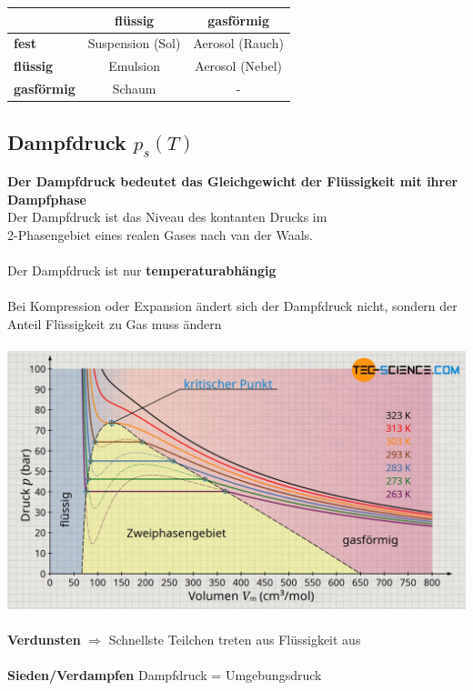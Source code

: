 \begin{center}
	\begin{tabular}{l|cc}
		                   & \textbf{flüssig} & \textbf{gasförmig} \\ \hline
		\textbf{fest}      & Suspension (Sol) & Aerosol (Rauch) \\
		\textbf{flüssig}   & Emulsion & Aerosol (Nebel) \\
		\textbf{gasförmig} & Schaum & - \\
	\end{tabular}
\end{center}






\subsection{Dampfdruck $p_s(T)$}
\textbf{Der Dampfdruck bedeutet das Gleichgewicht der Flüssigkeit mit ihrer Dampfphase} \\

Der Dampfdruck ist das Niveau des kontanten Drucks im\\
2-Phasengebiet eines realen Gases nach van der Waals. \\
\\
Der Dampfdruck ist nur \textbf{temperaturabhängig} \\
\\
Bei Kompression oder Expansion ändert sich der Dampfdruck nicht, sondern der Anteil Flüssigkeit zu Gas muss ändern \\
\\

\includegraphics[width=0.9\linewidth]{Bilder/dampfdruck} \\
\\
\textbf{Verdunsten} $\Rightarrow$ Schnellste Teilchen treten aus Flüssigkeit aus \\
\\
\textbf{Sieden/Verdampfen} Dampfdruck = Umgebungsdruck



